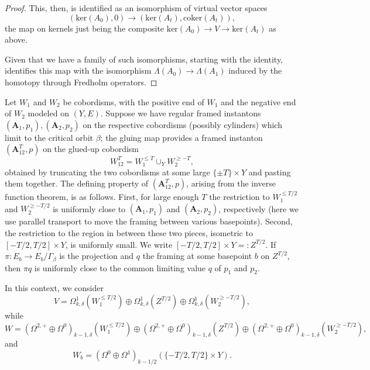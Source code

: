\documentclass[10pt,a4paper]{amsart}
\theoremstyle{definition}
\theoremstyle{remark}
\numberwithin{figure}{qchap}
\begin{document}
\begin{proof}
This, then, is identified as an isomorphism of virtual vector spaces 
$$(\text{ker}(A_0), 0) \to (\text{ker}(A_t), \text{coker}(A_t)),$$
the map on kernels just being the composite $\text{ker}(A_0) \to V \to \text{ker}(A_t)$ as above.

Given that we have a family of such isomorphisms, starting with the identity, identifies this map with the isomorphism $\Lambda(A_0) \to \Lambda(A_1)$ induced by the homotopy through Fredholm operators.
\end{proof}

Let $W_1$ and $W_2$ be cobordisms, with the positive end of $W_1$ and the negative end of $W_2$ modeled on $(Y, E)$. Suppose we have regular framed instantons $(\mathbf{A}_1,p_1), (\mathbf{A}_2,p_2)$ on the respective cobordisms (possibly cylinders) which limit to the critical orbit $\beta$; the gluing map provides a framed instanton $(\mathbf{A}_{12}^T,p)$ on the glued-up cobordism 
$$W_{12}^T = W_1^{\leq T} \cup_Y W_2^{\geq -T},$$ 
obtained by truncating the two cobordisms at some large $\{\pm T\} \times Y$ and pasting them together. The defining property of $(\mathbf{A}_{12}^T,p)$, arising from the inverse function theorem, is as follows. First, for large enough $T$ the restriction to $W_1^{\leq T/2}$ and $W_2^{\geq -T/2}$ is uniformly close to $(\mathbf{A}_1, p_1)$ and $(\mathbf{A}_2, p_2)$, respectively (here we use parallel transport to move the framing between various basepoints). Second, the restriction to the region in between these two pieces, isometric to $[-T/2, T/2] \times Y$, is uniformly small. We write $[-T/2, T/2] \times Y =: Z^{T/2}$. If $\pi: E_b \to E_b/\Gamma_{\beta}$ is the projection and $q$ the framing at some basepoint $b$ on $Z^{T/2}$, then $\pi q$ is uniformly close to the common limiting value $q$ of $p_1$ and $p_2$.

In this context, we consider 
$$V = \Omega^1_{k,\delta}(W_1^{\leq T/2}) \oplus \Omega^1_{k,\delta}(Z^{T/2}) \oplus \Omega^1_{k,\delta}(W_2^{\geq -T/2}),$$ 
while 
$$W = (\Omega^{2,+} \oplus \Omega^0)_{k-1,\delta}(W_1^{\leq T/2}) \oplus (\Omega^{2,+} \oplus \Omega^0)_{k-1,\delta}(Z^{T/2}) \oplus (\Omega^{2,+} \oplus \Omega^0)_{k-1,\delta}(W_2^{\geq -T/2}),$$ 
and 
$$W_b = (\Omega^0 \oplus \Omega^1)_{k-1/2}(\{-T/2, T/2\} \times Y).$$ 
\end{document}
